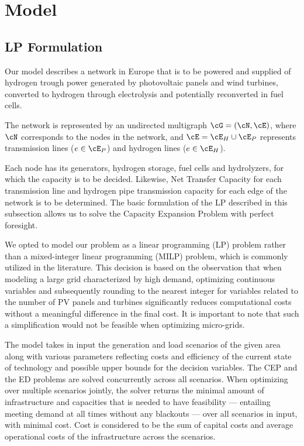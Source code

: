 \documentclass[smallextended,natbib]{svjour3}       %
\numberwithin{definition}{section}
\numberwithin{theorem}{section}
\numberwithin{proposition}{section}
\begin{document}
\section{Model}\label{section: model}

\subsection{LP Formulation}\label{subsection: LP}
Our model describes a network in Europe that is to be powered and supplied of hydrogen trough power generated by photovoltaic panels and wind turbines, converted to hydrogen through electrolysis and potentially reconverted in fuel cells.

The network is represented by an undirected multigraph \(\cG = (\cN, \cE)\), where \(\cN\) corresponds to the nodes in the network, and \(\cE = \cE_H \cup \cE_P\) represents transmission lines (\(e \in \cE_P\)) and hydrogen lines (\(e \in \cE_H\)).

Each node has its generators, hydrogen storage, fuel cells and hydrolyzers, for which the capacity is to be decided. 
Likewise, Net Transfer Capacity for each transmission line and hydrogen pipe transmission capacity for each edge of the network is to be determined. 
The basic formulation of the LP described in this subsection allows us to solve the Capacity Expansion Problem with perfect foresight. 

We opted to model our problem as a linear programming (LP) problem rather than a mixed-integer linear programming (MILP) problem, which is commonly utilized in the literature. 
This decision is based on the observation that when modeling a large grid characterized by high demand, optimizing continuous variables and subsequently rounding to the nearest integer for variables related to the number of PV panels and turbines significantly reduces computational costs without a meaningful difference in the final cost. 
It is important to note that such a simplification would not be feasible when optimizing micro-grids.

The model takes in input the generation and load scenarios of the given area along with various parameters reflecting costs and efficiency of the current state of technology and possible upper bounds for the decision variables. 
The CEP and the ED problems are solved concurrently across all scenarios.
When optimizing over multiple scenarios jointly, the solver returns the minimal amount of infrastructure and capacities that is needed to have feasibility — entailing meeting demand at all times without any blackouts — over all scenarios in input, with minimal cost. 
Cost is considered to be the sum of capital costs and average operational costs of the infrastructure across the scenarios.
\end{document}
